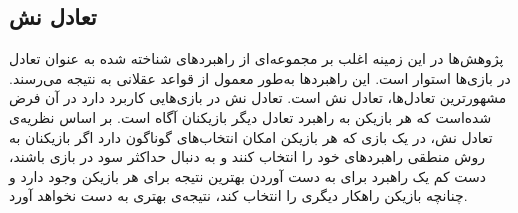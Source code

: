 \subsection{تعادل نش}
پژوهش‌ها در این زمینه اغلب بر مجموعه‌ای از راهبردهای شناخته شده به عنوان تعادل در بازی‌ها استوار است. این راهبردها به‌طور معمول از قواعد عقلانی به نتیجه می‌رسند. مشهورترین تعادل‌ها، تعادل نش است. 
تعادل نش در بازی‌هایی کاربرد دارد  در آن فرض شده‌است که هر بازیکن به راهبرد تعادل دیگر بازیکنان آگاه است.
بر اساس نظریه‌ی تعادل نش، در یک بازی که هر بازیکن امکان انتخاب‌های گوناگون دارد اگر بازیکنان به روش منطقی  راهبردهای خود را انتخاب کنند و به دنبال حداکثر سود در بازی باشند، دست کم یک راهبرد برای به دست آوردن بهترین نتیجه برای هر بازیکن وجود دارد و چنانچه بازیکن راهکار دیگری را انتخاب کند، نتیجه‌ی بهتری به دست نخواهد آورد.



